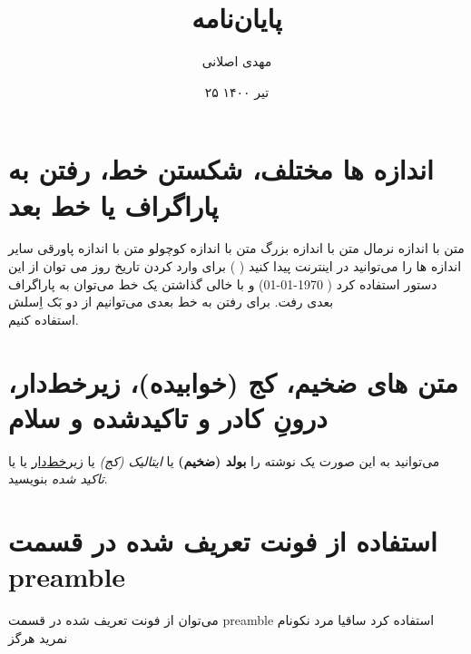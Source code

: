 \documentclass[12pt]{article}
\title{پایان‌نامه}
\author{مهدی اصلانی}
\date{۲۵ تیر ۱۴۰۰}
\begin{document}
\maketitle

\section{اندازه ها مختلف، شکستن خط، رفتن به پاراگراف یا خط بعد }


متن با اندازه نرمال
{\LARGE متن با اندازه بزرگ}
{\tiny  متن با اندازه کوچولو}
 {\footnotesize متن با اندازه پاورقی}
سایر اندازه ها را می‌توانید در اینترنت پیدا کنید (
)
  برای وارد کردن تاریخ روز می توان از این دستور استفاده کرد
( \today )
و با خالی گذاشتن یک خط می‌توان به پاراگراف بعدی رفت. برای رفتن به خط بعدی می‌توانیم از دو بَک اِسلش \\ استفاده کنیم.


\section{متن های ضخیم، کج (خوابیده)، زیرخط‌دار، درونِ کادر و تاکید‌شده و سلام}
می‌توانید به این صورت  یک نوشته را 
\textbf{بولد (ضخیم)}
یا
\textit{ایتالیک (کج)}
یا
\underline{زیرخط‌دار}
یا
یا
\emph{تاکید شده}
بنویسید.


\section{استفاده از فونت تعریف شده در قسمت preamble}
می‌توان از فونت تعریف شده در قسمت preamble استفاده کرد
{\LARGE \nast ساقیا مرد نکونام نمرید هرگز}
\end{document}
